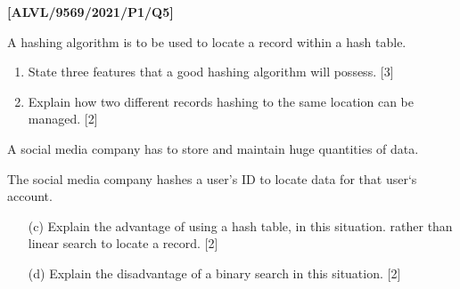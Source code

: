 \item \textbf{{[}ALVL/9569/2021/P1/Q5{]} }

A hashing algorithm is to be used to locate a record within a hash
table.
\begin{enumerate}
\item State three features that a good hashing algorithm will possess.\hfill{}
{[}3{]}
\item Explain how two different records hashing to the same location can
be managed. \hfill{}{[}2{]}
\end{enumerate}
A social media company has to store and maintain huge quantities of
data.

The social media company hashes a user's ID to locate data for that
user\textquoteleft s account.
\begin{enumerate}
\item[(c)]  Explain the advantage of using a hash table, in this situation.
rather than linear search to locate a record.\hfill{} {[}2{]}
\item[(d)]  Explain the disadvantage of a binary search in this situation.\hfill{}
{[}2{]}
\end{enumerate}